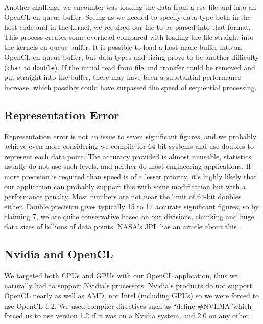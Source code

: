 Another challenge we encounter was loading the data from a csv file and into an OpenCL en-queue buffer. Seeing as we needed to specify data-type both in the host code and in the kernel, we required our file to be parsed into that format. This process creates some overhead compared with loading the file straight into the kernels en-queue buffer. It is possible to load a host made buffer into an OpenCL en-queue buffer, but data-types and sizing prove to be another difficulty (\texttt{char} to \texttt{double}). If the initial read from file and transfer could be removed and put straight into the buffer, there may have been a substantial performance increase, which possibly could have surpassed the speed of sequential processing.

\subsection{Representation Error}
Representation error is not an issue to seven significant figures, and we probably achieve even more considering we compile for 64-bit systems and use doubles to represent each data point. The accuracy provided is almost unusable, statistics usually do not use such levels, and neither do most engineering applications. If more precision is required than speed is of a lesser priority, it's highly likely that our application can probably support this with some modification but with a performance penalty. Most numbers are not near the limit of 64-bit doubles either. Double precision gives typically 15 to 17 accurate significant figures, so by claiming 7, we are quite conservative based on our divisions, chunking and huge data sizes of billions of data points. NASA's JPL has an article about this \cite{nasa_2016}.

\subsection{Nvidia and OpenCL}
We targeted both CPUs and GPUs with our OpenCL application, thus we naturally had to support Nvidia's processors. Nvidia's products do not support OpenCL nearly as well as AMD, nor Intel (including GPUs) so we were forced to use OpenCL 1.2. We used compiler directives such as ``define \#NVIDIA''which forced us to use version 1.2 if it was on a Nvidia system, and 2.0 on any other.

